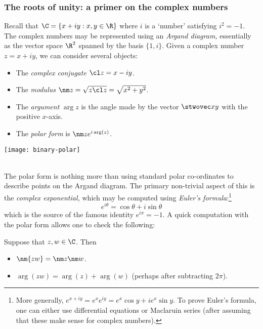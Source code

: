 \subsubsection*{The roots of unity: a primer on the complex numbers}

\begin{minipage}[t]{0.65\textwidth}\vspace{0pt}
Recall that $\C=\{x+iy:x,y\in\R\}$ where $i$ is a `number' satisfying $i^2=-1$. The complex numbers may be represented using an \emph{Argand diagram,} essentially as the vector space $\R^2$ spanned by the basis $\{1,i\}$.
Given a complex number $z=x+iy$, we can consider several objects:
\begin{itemize}
  \item The \emph{complex conjugate} $\cl z=x-iy$.
  \item The \emph{modulus} $\nm z=\sqrt{z\cl z}=\sqrt{x^2+y^2}$.
  \item The \emph{argument} $\arg z$ is the angle made by the vector $\stwovec xy$ with the positive $x$-axis.
  \item The \emph{polar form} is $\nm ze^{i\arg(z)}$.
\end{itemize}
\end{minipage}
\begin{minipage}[t]{0.35\textwidth}\vspace{0pt}
\flushright\texttt{[image: binary-polar]}
\end{minipage}\\

The polar form is nothing more than using standard polar co-ordinates to describe points on the Argand diagram. The primary non-trivial aspect of this is the \emph{complex exponential,} which may be computed using \emph{Euler's formula}:\footnote{More generally, $e^{x+iy}=e^xe^{iy}=e^x\cos y+ie^x\sin y$. To prove Euler's formula, one can either use differential equations or Maclaruin series (after assuming that these make sense for complex numbers).}
\[e^{i\theta}=\cos\theta+i\sin\theta\]
which is the source of the famous identity $\displaystyle e^{i\pi}=-1$. A quick computation with the polar form allows one to check the following:

\begin{lemm}
Suppose that $z,w\in\C$. Then
\begin{itemize}
  \item $\nm{zw}=\nm z\nm w$.
  \item $\arg(zw)=\arg(z)+\arg(w)$ (perhaps after subtracting $2\pi$).
\end{itemize}
\end{lemm}

